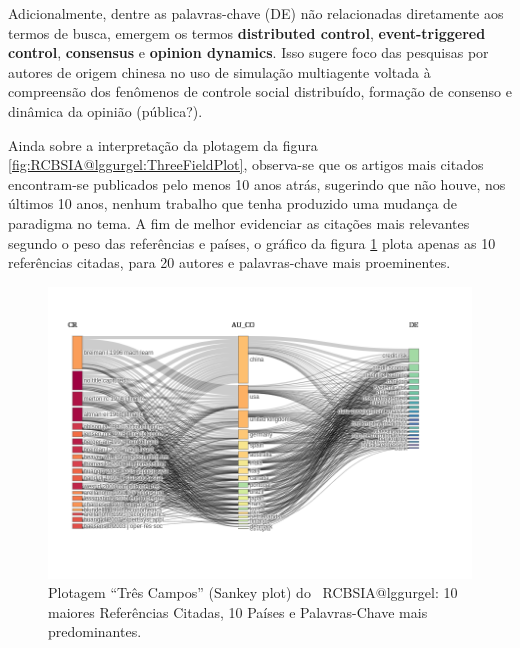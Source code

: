 Adicionalmente, dentre as palavras-chave (DE) não relacionadas diretamente aos termos de busca, emergem os termos \textbf{distributed control}, \textbf{event-triggered control}, \textbf{consensus} e \textbf{opinion dynamics}. Isso sugere foco das pesquisas por autores de origem chinesa no uso de simulação multiagente voltada à compreensão dos fenômenos de controle social distribuído, formação de consenso e dinâmica da opinião (pública?).

Ainda sobre a interpretação da plotagem da figura \ref{fig:RCBSIA@lggurgel:ThreeFieldPlot}, observa-se que os artigos mais citados encontram-se publicados pelo menos 10 anos atrás, sugerindo que não houve, nos últimos 10 anos, nenhum trabalho que tenha produzido uma mudança de paradigma no tema.
A fim de melhor evidenciar as citações mais relevantes segundo o peso das referências e países, o gráfico da figura \ref{fig:RCBSIA@lggurgel:ThreeFieldPlot2} plota apenas as 10 referências citadas, para 20 autores e palavras-chave mais proeminentes.

\begin{figure}
    \centering
\includegraphics[angle=0,width=1\textwidth]{experiments/lggurgel/AnaliseBibliometrica/RiscoBancario/Figs/Descritiva/RCBSIA-GraficoArvore-CR-AU_CO-DE.png}
    \caption{Plotagem ``Três Campos'' (Sankey plot) do \dataset\   RCBSIA@lggurgel: 10 maiores Referências Citadas, 10 Países e Palavras-Chave mais predominantes.}
    \label{fig:RCBSIA@lggurgel:ThreeFieldPlot2}
\end{figure}

